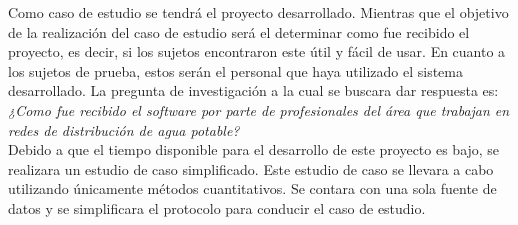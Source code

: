 \documentclass[11pt,letterpaper]{article}
\begin{document}
Como caso de estudio se tendrá el proyecto desarrollado. Mientras que el objetivo de la realización del caso de estudio será el determinar como fue recibido el proyecto, es decir, si los sujetos encontraron este útil y fácil de usar. En cuanto a los sujetos de prueba, estos serán el personal que haya utilizado el sistema desarrollado. La pregunta de investigación a la cual se buscara dar respuesta es:\\

\textit{¿Como fue recibido el software por parte de profesionales del área que trabajan en redes de distribución de agua potable?}\\

Debido a que el tiempo disponible para el desarrollo de este proyecto es bajo, se realizara un estudio de caso simplificado. Este estudio de caso se llevara a cabo utilizando únicamente métodos cuantitativos. Se contara con una sola fuente de datos y se simplificara el protocolo para conducir el caso de estudio.



%
\end{document}
